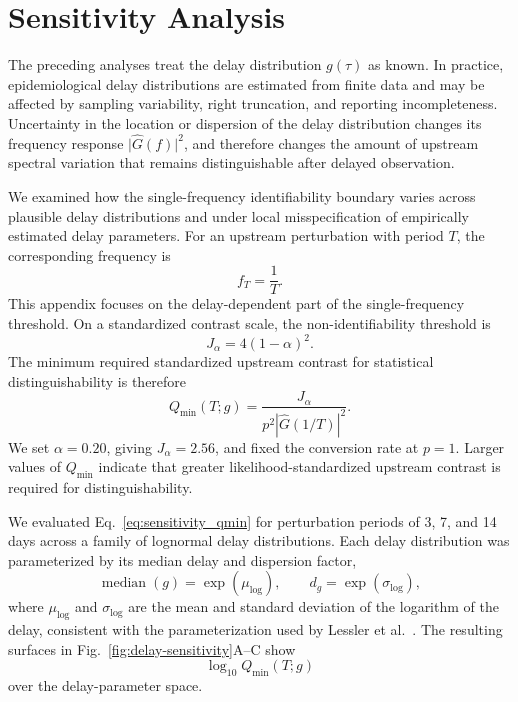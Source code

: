 \renewcommand{\thesection}{S\arabic{section}}
\setcounter{section}{4}
\section{Sensitivity Analysis}
\label{sec:Appendix_S5}

The preceding analyses treat the delay distribution \(g(\tau)\) as known. In practice, epidemiological delay distributions are estimated from finite data and may be affected by sampling variability, right truncation, and reporting incompleteness. Uncertainty in the location or dispersion of the delay distribution changes its frequency response \(\lvert \widehat G(f) \rvert^2\), and therefore changes the amount of upstream spectral variation that remains distinguishable after delayed observation.

We examined how the single-frequency identifiability boundary varies across plausible delay distributions and under local misspecification of empirically estimated delay parameters. For an upstream perturbation with period \(T\), the corresponding frequency is
\[
f_T = \frac{1}{T}.
\]
This appendix focuses on the delay-dependent part of the single-frequency threshold. On a standardized contrast scale, the non-identifiability threshold is
\[
J_{\alpha}=4(1-\alpha)^2.
\]
The minimum required standardized upstream contrast for statistical distinguishability is therefore
\begin{equation}
Q_{\min}(T;g)
=
\frac{J_{\alpha}}
{p^2\left\lvert \widehat G(1/T)\right\rvert^2}.
\label{eq:sensitivity_qmin}
\end{equation}
We set \(\alpha=0.20\), giving \(J_{\alpha}=2.56\), and fixed the conversion rate at \(p=1\). Larger values of \(Q_{\min}\) indicate that greater likelihood-standardized upstream contrast is required for distinguishability.

We evaluated Eq.~\eqref{eq:sensitivity_qmin} for perturbation periods of 3, 7, and 14 days across a family of lognormal delay distributions. Each delay distribution was parameterized by its median delay and dispersion factor,
\[
\operatorname{median}(g)=\exp(\mu_{\log}),
\qquad
d_g=\exp(\sigma_{\log}),
\]
where \(\mu_{\log}\) and \(\sigma_{\log}\) are the mean and standard deviation of the logarithm of the delay, consistent with the
parameterization used by Lessler et al.~\cite{lessler2009incubation}. The resulting surfaces in Fig.~\ref{fig:delay-sensitivity}A--C show
\[
\log_{10} Q_{\min}(T;g)
\]
over the delay-parameter space.

